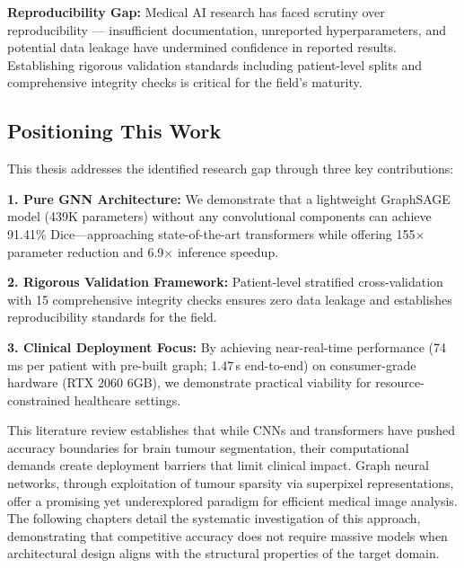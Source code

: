 \textbf{Reproducibility Gap:} Medical AI research has faced scrutiny over reproducibility — insufficient documentation, unreported hyperparameters, and potential data leakage have undermined confidence in reported results. Establishing rigorous validation standards including patient-level splits and comprehensive integrity checks is critical for the field's maturity.

\subsection{Positioning This Work}

This thesis addresses the identified research gap through three key contributions:

\textbf{1. Pure GNN Architecture:} We demonstrate that a lightweight GraphSAGE model (439K parameters) without any convolutional components can achieve 91.41\% Dice—approaching state-of-the-art transformers while offering 155$\times$ parameter reduction and 6.9$\times$ inference speedup.

\textbf{2. Rigorous Validation Framework:} Patient-level stratified cross-validation with 15 comprehensive integrity checks ensures zero data leakage and establishes reproducibility standards for the field.

\textbf{3. Clinical Deployment Focus:} By achieving near-real-time performance (74\,ms per patient with pre-built graph; 1.47\,s end-to-end) on consumer-grade hardware (RTX 2060 6GB), we demonstrate practical viability for resource-constrained healthcare settings.

\vspace{5mm}

This literature review establishes that while CNNs and transformers have pushed accuracy boundaries for brain tumour segmentation, their computational demands create deployment barriers that limit clinical impact. Graph neural networks, through exploitation of tumour sparsity via superpixel representations, offer a promising yet underexplored paradigm for efficient medical image analysis. The following chapters detail the systematic investigation of this approach, demonstrating that competitive accuracy does not require massive models when architectural design aligns with the structural properties of the target domain.

\clearpage